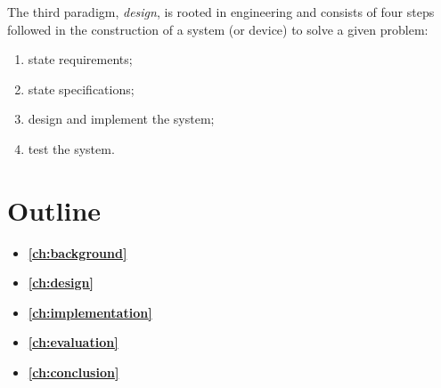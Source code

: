 The third paradigm, \emph{design}, is rooted in engineering and consists of four steps followed in the construction of a system (or device) to solve a given problem:
\begin{enumerate}
    \item state requirements; 
    \item state specifications;
    \item design and implement the system;
    \item test the system.
\end{enumerate}

\section{Outline}\label{sec:outline}
\begin{itemize}
    \item[] \textbf{\autoref{ch:background}}
    \item[] \textbf{\autoref{ch:design}}
    \item[] \textbf{\autoref{ch:implementation}}
    \item[] \textbf{\autoref{ch:evaluation}}
    \item[] \textbf{\autoref{ch:conclusion}}
\end{itemize}